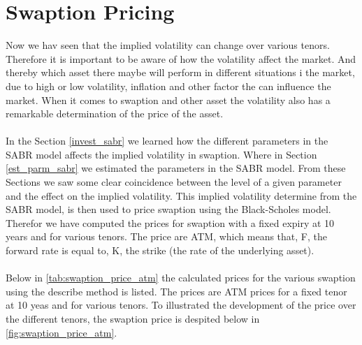 \section{Swaption Pricing} \label{swaption_price_sec}
Now we hav seen that the implied volatility can change over various tenors. 
Therefore it is important to be aware of how the volatility affect the market.
And thereby which asset there maybe will perform in different situations i the market,
due to high or low volatility, inflation and other factor the can influence the market.
When it comes to swaption and other asset the volatility also has
a remarkable determination of the price of the asset. 
\\\\
In the Section \ref{invest_sabr} we learned how the different parameters in the 
SABR model affects the implied volatility in swaption. 
Where in Section \ref{est_parm_sabr} we estimated the parameters in the SABR model. 
From these Sections we saw some clear coincidence between the level of a given parameter
and the effect on the implied volatility. 
This implied volatility determine from the SABR model, is then used to price swaption using the 
Black-Scholes model. 
Therefor we have computed the prices for swaption with a fixed expiry at 10 years and for various tenors. 
The price are ATM, which means that, F, the forward rate is equal to, K, 
the strike (the rate of the underlying asset). 
\\\\
Below in \autoref{tab:swaption_price_atm} the calculated prices for the various swaption 
using the describe method is listed. 
The prices are ATM prices for a fixed tenor at 10 yeas and for various tenors. 
To illustrated the development of the price over the different tenors, 
the swaption price is despited below in  \autoref{fig:swaption_price_atm}.
\begin{table}[H]
  \centering
  \caption{ATM swaption price in basis point for a 10 years fixed expiry and various tenors.
  Data source  \\ Citi Velocity 21.02.2024}
  \label{tab:swaption_price_atm}
\end{table}

